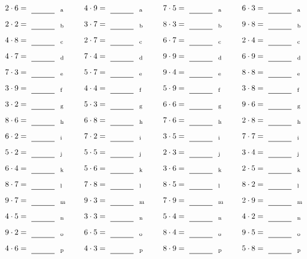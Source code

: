 \documentclass
[
  draft    = true,
  fontsize = 11pt,
  parskip  = half-
]
{scrartcl}
\begin{document}
\par\vfill\par
\begin{align*}
    \pline{2\cdot6}&=\rline{a}
  & \pline{4\cdot9}&=\rline{a}
  & \pline{7\cdot5}&=\rline{a}
  & \pline{6\cdot3}&=\rline{a} \\[1ex]
    \pline{2\cdot2}&=\rline{b}
  & \pline{3\cdot7}&=\rline{b}
  & \pline{8\cdot3}&=\rline{b}
  & \pline{9\cdot8}&=\rline{b} \\[1ex]
    \pline{4\cdot8}&=\rline{c}
  & \pline{2\cdot7}&=\rline{c}
  & \pline{6\cdot7}&=\rline{c}
  & \pline{2\cdot4}&=\rline{c} \\[1ex]
    \pline{4\cdot7}&=\rline{d}
  & \pline{7\cdot4}&=\rline{d}
  & \pline{9\cdot9}&=\rline{d}
  & \pline{6\cdot9}&=\rline{d} \\[1ex]
    \pline{7\cdot3}&=\rline{e}
  & \pline{5\cdot7}&=\rline{e}
  & \pline{9\cdot4}&=\rline{e}
  & \pline{8\cdot8}&=\rline{e} \\[1ex]
    \pline{3\cdot9}&=\rline{f}
  & \pline{4\cdot4}&=\rline{f}
  & \pline{5\cdot9}&=\rline{f}
  & \pline{3\cdot8}&=\rline{f} \\[1ex]
    \pline{3\cdot2}&=\rline{g}
  & \pline{5\cdot3}&=\rline{g}
  & \pline{6\cdot6}&=\rline{g}
  & \pline{9\cdot6}&=\rline{g} \\[1ex]
    \pline{8\cdot6}&=\rline{h}
  & \pline{6\cdot8}&=\rline{h}
  & \pline{7\cdot6}&=\rline{h}
  & \pline{2\cdot8}&=\rline{h} \\[1ex]
    \pline{6\cdot2}&=\rline{i}
  & \pline{7\cdot2}&=\rline{i}
  & \pline{3\cdot5}&=\rline{i}
  & \pline{7\cdot7}&=\rline{i} \\[1ex]
    \pline{5\cdot2}&=\rline{j}
  & \pline{5\cdot5}&=\rline{j}
  & \pline{2\cdot3}&=\rline{j}
  & \pline{3\cdot4}&=\rline{j} \\[1ex]
    \pline{6\cdot4}&=\rline{k}
  & \pline{5\cdot6}&=\rline{k}
  & \pline{3\cdot6}&=\rline{k}
  & \pline{2\cdot5}&=\rline{k} \\[1ex]
    \pline{8\cdot7}&=\rline{l}
  & \pline{7\cdot8}&=\rline{l}
  & \pline{8\cdot5}&=\rline{l}
  & \pline{8\cdot2}&=\rline{l} \\[1ex]
    \pline{9\cdot7}&=\rline{m}
  & \pline{9\cdot3}&=\rline{m}
  & \pline{7\cdot9}&=\rline{m}
  & \pline{2\cdot9}&=\rline{m} \\[1ex]
    \pline{4\cdot5}&=\rline{n}
  & \pline{3\cdot3}&=\rline{n}
  & \pline{5\cdot4}&=\rline{n}
  & \pline{4\cdot2}&=\rline{n} \\[1ex]
    \pline{9\cdot2}&=\rline{o}
  & \pline{6\cdot5}&=\rline{o}
  & \pline{8\cdot4}&=\rline{o}
  & \pline{9\cdot5}&=\rline{o} \\[1ex]
    \pline{4\cdot6}&=\rline{p}
  & \pline{4\cdot3}&=\rline{p}
  & \pline{8\cdot9}&=\rline{p}
  & \pline{5\cdot8}&=\rline{p}
\end{align*}
\end{document}
